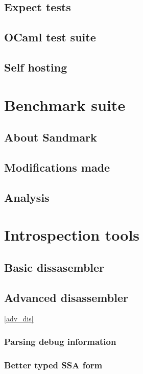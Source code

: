 \subsection{Expect tests}

\subsection{OCaml test suite}

\subsection{Self hosting}

\section{Benchmark suite}

\subsection{About Sandmark}

\subsection{Modifications made}

\subsection{Analysis}

\section{Introspection tools}

\subsection{Basic dissasembler}

\subsection{Advanced disassembler} \ref{adv_dis}

\subsubsection{Parsing debug information}

\subsubsection{Better typed SSA form}